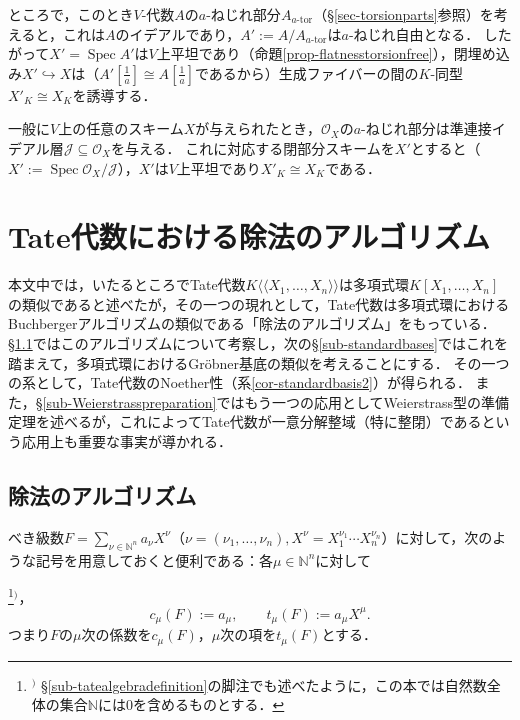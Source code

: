 \documentclass[a4paper,12pt, dvipdfmx]{jsbook}
\def\N{\mathbb{N}}
\def\O{\mathscr{O}}
\def\Spec{\mathop{\mathrm{Spec}}\nolimits}
\def\ator{\textrm{$a$-}\mathrm{tor}}
\def\dl{\langle\!\langle}
\def\dr{\rangle\!\rangle}
\theoremstyle{plain}
\theoremstyle{definition}
\newcounter{chushaku}
\def\chu#1{\addtocounter{chushaku}{1}\footnote[\value{chushaku}]{${}^)$ #1}${}^)$}
\begin{document}
ところで，このとき$V$-代数$A$の$a$-ねじれ部分$A_{\ator}$（\S\ref{sec-torsionparts}参照）を考えると，これは$A$のイデアルであり，$A':=A/A_{\ator}$は$a$-ねじれ自由となる．
したがって$X'=\Spec A'$は$V$上平坦であり（命題\ref{prop-flatnesstorsionfree}），閉埋め込み$X'\hookrightarrow X$は（$A'[\frac{1}{a}]\cong A[\frac{1}{a}]$であるから）生成ファイバーの間の$K$-同型$X'_K\cong X_K$を誘導する．

一般に$V$上の任意のスキーム$X$が与えられたとき，$\O_X$の$a$-ねじれ部分は準連接イデアル層$\mathscr{J}\subseteq\O_X$を与える．
これに対応する閉部分スキームを$X'$とすると（$X':=\Spec\O_X/\mathscr{J}$），$X'$は$V$上平坦であり$X'_K\cong X_K$である．


\setcounter{chushaku}{0}
\chapter{Tate代数における除法のアルゴリズム}\label{CH-DIVISIONALGORITHM}
本文中では，いたるところでTate代数$K\dl X_1,\ldots,X_n\dr$は多項式環$K[X_1,\ldots,X_n]$の類似であると述べたが，その一つの現れとして，Tate代数は多項式環におけるBuchbergerアルゴリズムの類似である「除法のアルゴリズム」をもっている．
\S\ref{sec-divisionalgorithm}ではこのアルゴリズムについて考察し，次の\S\ref{sub-standardbases}ではこれを踏まえて，多項式環におけるGr\"obner基底の類似を考えることにする．
その一つの系として，Tate代数のNoether性（系\ref{cor-standardbasis2}）が得られる．
また，\S\ref{sub-Weierstrasspreparation}ではもう一つの応用としてWeierstrass型の準備定理を述べるが，これによってTate代数が一意分解整域（特に整閉）であるという応用上も重要な事実が導かれる．

\section{除法のアルゴリズム}\label{sec-divisionalgorithm}
べき級数$F=\sum_{\nu\in\N^n}a_{\nu}X^{\nu}$（$\nu=(\nu_1,\ldots,\nu_n),X^{\nu}=X^{\nu_1}_1\cdots X^{\nu_n}_n$）に対して，次のような記号を用意しておくと便利である：各$\mu\in\N^n$に対して\chu{\S\ref{sub-tatealgebradefinition}の脚注でも述べたように，この本では自然数全体の集合$\N$には$0$を含めるものとする．}，
$$
c_{\mu}(F):=a_{\mu},\qquad t_{\mu}(F):=a_{\mu}X^{\mu}.
$$
つまり$F$の$\mu$次の係数を$c_{\mu}(F)$，$\mu$次の項を$t_{\mu}(F)$とする．
\end{document}
